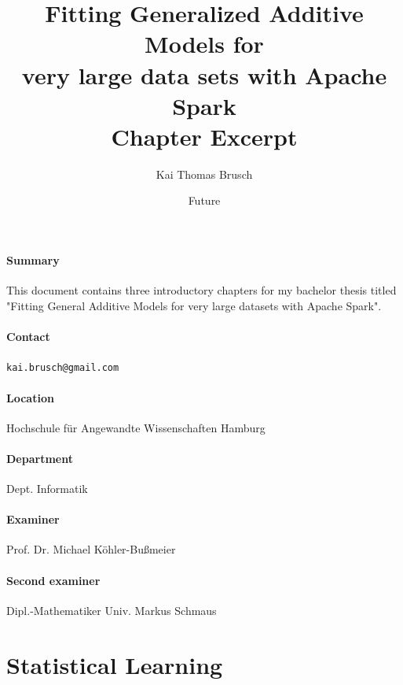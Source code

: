 \documentclass{article}
\title{
    Fitting Generalized Additive Models for\\ very large data sets with Apache Spark \\[7pt]
    \large Chapter Excerpt
}
\date{Future}
\author{Kai Thomas Brusch}
\begin{document}

    \maketitle

    \paragraph{Summary}

    This document contains three introductory chapters for my bachelor thesis titled "Fitting General Additive Models for very large datasets with Apache Spark".

    \paragraph{Contact} \texttt{kai.brusch@gmail.com}

    \paragraph{Location} Hochschule für Angewandte Wissenschaften Hamburg
    \paragraph{Department} Dept. Informatik
    \paragraph{Examiner} Prof. Dr. Michael Köhler-Bußmeier
    \paragraph{Second examiner} Dipl.-Mathematiker Univ. Markus Schmaus

    \newpage

    \tableofcontents

    \newpage

    
        \section{Statistical Learning}
    
\end{document}
